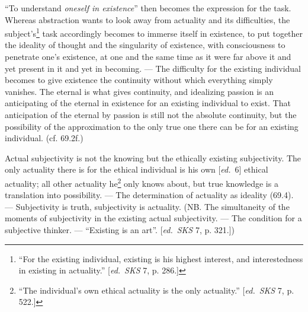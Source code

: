 \documentclass[12pt,a4paper,openany]{book}
\newcommand{\kpage}[1]{\marginnote{\footnotesize\textit{[#1]}}}
\newcommand{\ed}[1]{{\small[\textit{ed.}\ #1]}}
\begin{document}
``To understand \emph{oneself in existence}'' then becomes the expression for the task.
Whereas abstraction wants to look away from actuality and its difficulties,
the subject's\footnote[50]{``For the existing individual, existing is his highest interest, and interestedness
in existing in actuality.'' \ed{\emph{SKS} 7, p. 286.}}
task accordingly becomes to immerse itself in existence,
to put together the ideality of thought and the singularity of existence,
with consciousness to penetrate one's existence, at one and the same
time as it were far above it and yet present in it and yet in
becoming. --- The difficulty for the existing individual becomes to give existence
the continuity without which everything simply vanishes. The
eternal is what gives continuity, and idealizing passion
is an anticipating of the eternal in existence for an existing individual to
exist. That anticipation of the eternal by passion is still not
the absolute continuity, but the possibility of the approximation
to the only true one there can be for an existing individual. (cf. 69.2f.)

Actual subjectivity is not the knowing but the ethically existing
subjectivity. The only actuality there is for the
ethical individual is his own \ed{6} ethical actuality; all other actuality he\footnote[51]{``The individual's own ethical actuality is the only actuality.'' \ed{\emph{SKS} 7, p. 522.}} only
knows about, but true knowledge is a translation into possibility.
--- The determination of actuality as ideality (69.4). --- Subjectivity
is truth, subjectivity is actuality.
\kpage{128}(NB. The simultaneity of the moments of subjectivity in the existing
actual subjectivity. --- The condition for a subjective thinker. ---
``Existing is an art''. \ed{\emph{SKS} 7, p. 321.})
\end{document}
